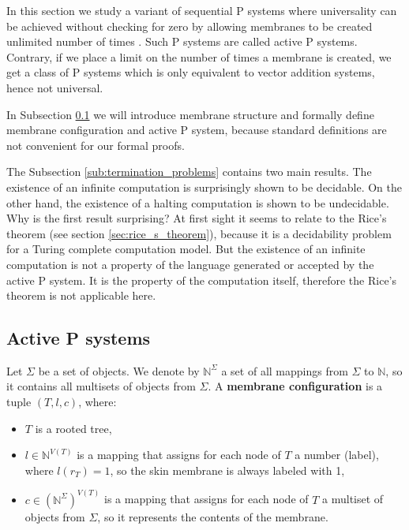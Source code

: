 In this section we study a variant of  sequential P systems where universality can be achieved without checking for zero by allowing membranes to be created unlimited number of times \cite{Ibarra05Active}. Such P systems are called active P systems. Contrary, if we place a limit on the number of times a membrane is created, we get a class of P systems which is only equivalent to vector addition systems, hence not universal.

In Subsection \ref{sub:active_p_systems} we will introduce membrane structure and formally define membrane configuration and active P system, because standard definitions are not convenient for our formal proofs.

The Subsection \ref{sub:termination_problems} contains two main results. The existence of an infinite computation is surprisingly shown to be decidable. On the other hand, the existence of a halting computation is shown to be undecidable. Why is the first result surprising? At first sight it seems to relate to the Rice's theorem (see section \ref{sec:rice_s_theorem}), because it is a decidability problem for a Turing complete computation model. But the existence of an infinite computation is not a property of the language generated or accepted by the active P system. It is the property of the computation itself, therefore the  Rice's theorem is not applicable here.

\subsection{Active P systems} %
\label{sub:active_p_systems}

\begin{definition}
  \label{def:membrane_structure}
  Let $\Sigma$ be a set of objects. We denote by $\mathbb N^\Sigma$ a set of all mappings from $\Sigma$ to $\mathbb N$, so it contains all multisets of objects from $\Sigma$. A  {\bf membrane configuration} is a tuple $(T, l, c)$, where:
  \begin{itemize}
    \item $T$ is a rooted tree,
    \item $l\in\mathbb N^{V(T)}$ is a mapping that assigns for each node of $T$ a number (label), where $l(r_T)=1$, so the skin membrane is always labeled with 1,
    \item $c\in(\mathbb N^\Sigma)^{V(T)}$ is a mapping that assigns for each node of $T$ a multiset of objects from $\Sigma$, so it represents the contents of the membrane.
  \end{itemize}
\end{definition}


